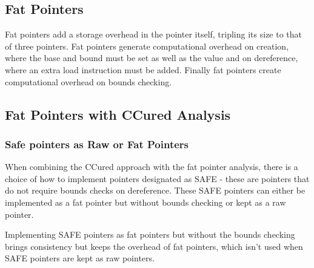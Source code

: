 \subsection{Fat Pointers}

Fat pointers add a storage overhead in the pointer itself, tripling its size to that of three pointers.
Fat pointers generate computational overhead on creation, where the base and bound must be set as well as the value and on dereference, where an extra load instruction must be added.
Finally fat pointers create computational overhead on bounds checking.

\subsection{Fat Pointers with CCured Analysis}

\subsubsection{Safe pointers as Raw or Fat Pointers}

When combining the CCured approach with the fat pointer analysis, there is a choice of how to implement pointers designated as SAFE - these are pointers that do not require bounds checks on dereference.
These SAFE pointers can either be implemented as a fat pointer but without bounds checking or kept as a raw pointer.

Implementing SAFE pointers as fat pointers but without the bounds checking brings consistency but keeps the overhead of fat pointers, which isn't used when SAFE pointers are kept as raw pointers.
